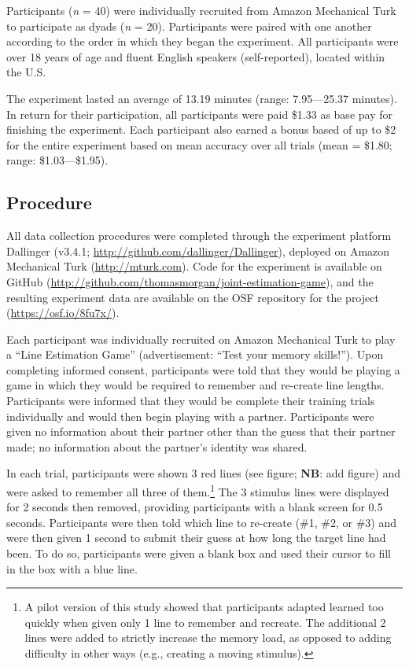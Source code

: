 \documentclass[10pt, letterpaper]{article}
\begin{document}
Participants (\emph{n} = 40) were individually recruited from Amazon
Mechanical Turk to participate as dyads (\emph{n} = 20). Participants
were paired with one another according to the order in which they began
the experiment. All participants were over 18 years of age and fluent
English speakers (self-reported), located within the U.S.

The experiment lasted an average of 13.19 minutes (range: 7.95---25.37
minutes). In return for their participation, all participants were paid
\$1.33 as base pay for finishing the experiment. Each participant also
earned a bonus based of up to \$2 for the entire experiment based on
mean accuracy over all trials (mean = \$1.80; range: \$1.03---\$1.95).

\subsection{Procedure}\label{procedure}

All data collection procedures were completed through the experiment
platform Dallinger (v3.4.1;
\url{http://github.com/dallinger/Dallinger}), deployed on Amazon
Mechanical Turk (\url{http://mturk.com}). Code for the experiment is
available on GitHub
(\url{http://github.com/thomasmorgan/joint-estimation-game}), and the
resulting experiment data are available on the OSF repository for the
project (\url{https://osf.io/8fu7x/}).

Each participant was individually recruited on Amazon Mechanical Turk to
play a ``Line Estimation Game'' (advertisement: ``Test your memory
skills!''). Upon completing informed consent, participants were told
that they would be playing a game in which they would be required to
remember and re-create line lengths. Participants were informed that
they would be complete their training trials individually and would then
begin playing with a partner. Participants were given no information
about their partner other than the guess that their partner made; no
information about the partner's identity was shared.

In each trial, participants were shown 3 red lines (see figure;
\textbf{NB}: add figure) and were asked to remember all three of
them.\footnote{A pilot version of this study showed that participants adapted learned too quickly when given only 1 line to remember and recreate. The additional 2 lines were added to strictly increase the memory load, as opposed to adding difficulty in other ways (e.g., creating a moving stimulus).}
The 3 stimulus lines were displayed for 2 seconds then removed,
providing participants with a blank screen for 0.5 seconds. Participants
were then told which line to re-create (\#1, \#2, or \#3) and were then
given 1 second to submit their guess at how long the target line had
been. To do so, participants were given a blank box and used their
cursor to fill in the box with a blue line.
\end{document}
